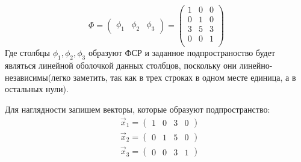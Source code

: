 	\[\Phi = 
		\begin{pmatrix}
		\phi_1 & \phi_2 & \phi_3 
		\end{pmatrix} = 
		\begin{pmatrix}
		1 & 0 &  0 \\
		0 & 1 &  0 \\
		3 & 5 &  3 \\
		0 & 0 &  1 \\
		\end{pmatrix}
	\]
	Где столбцы $\phi_1, \phi_2, \phi_3$ образуют ФСР и заданное подпространоство будет являться линейной оболочкой данных столбцов, поскольку они линейно-независимы(легко заметить, так как в трех строках в одном месте единица, а в остальных нули). 
	
	Для наглядности запишем векторы, которые образуют подпространство:
	\begin{align*}
		&\vec x_1 =  \begin{pmatrix} 1 & 0 & 3 & 0 \end{pmatrix} \\
		&\vec x_2 =  \begin{pmatrix} 0 & 1 & 5 & 0 \end{pmatrix} \\
		&\vec x_3 =  \begin{pmatrix} 0 & 0 & 3 & 1 \end{pmatrix} \\
	\end{align*}
	

